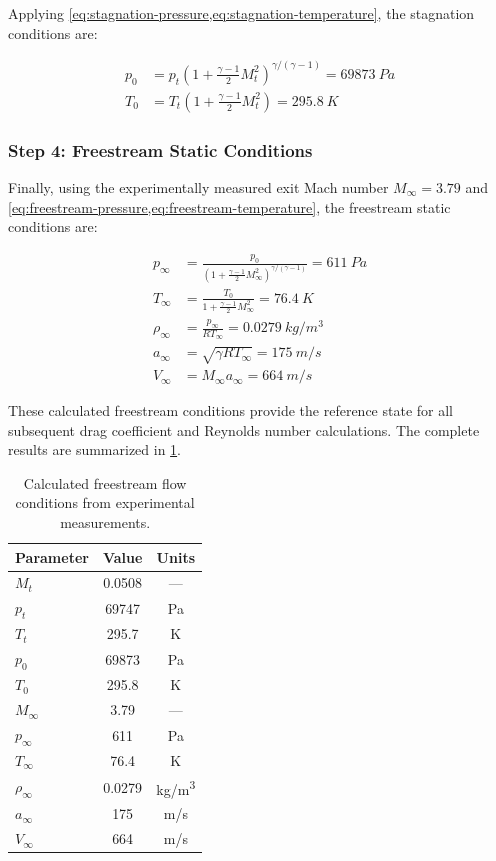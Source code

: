 Applying \cref{eq:stagnation-pressure,eq:stagnation-temperature}, the stagnation conditions are:

\begin{align}
    p_0 &= p_t \left(1 + \frac{\gamma - 1}{2}M_t^2\right)^{\gamma/(\gamma-1)} = \qty{69873}{Pa} \\
    T_0 &= T_t \left(1 + \frac{\gamma - 1}{2}M_t^2\right) = \qty{295.8}{K}
\end{align}

\subsubsection{Step 4: Freestream Static Conditions}

Finally, using the experimentally measured exit Mach number $M_\infty = 3.79$ and \cref{eq:freestream-pressure,eq:freestream-temperature}, the freestream static conditions are:

\begin{align}
    p_\infty &= \frac{p_0}{\left(1 + \frac{\gamma - 1}{2}M_\infty^2\right)^{\gamma/(\gamma-1)}} = \qty{611}{Pa} \\
    T_\infty &= \frac{T_0}{1 + \frac{\gamma - 1}{2}M_\infty^2} = \qty{76.4}{K} \\
    \rho_\infty &= \frac{p_\infty}{RT_\infty} = \qty{0.0279}{kg/m^3} \\
    a_\infty &= \sqrt{\gamma R T_\infty} = \qty{175}{m/s} \\
    V_\infty &= M_\infty a_\infty = \qty{664}{m/s}
\end{align}

These calculated freestream conditions provide the reference state for all subsequent drag coefficient and Reynolds number calculations.  The complete results are summarized in \cref{tab:results/freestream/summary}.

\begin{table}[H]
    \centering
    \caption{Calculated freestream flow conditions from experimental measurements.}
    \label{tab:results/freestream/summary}
    \begin{tabular}{lcc}
        \toprule
        \textbf{Parameter} & \textbf{Value} & \textbf{Units} \\
        \midrule
        $M_t$ & 0.0508 & --- \\
        $p_t$ & 69747 & Pa \\
        $T_t$ & 295.7 & K \\
        $p_0$ & 69873 & Pa \\
        $T_0$ & 295.8 & K \\
        $M_\infty$ & 3.79 & --- \\
        $p_\infty$ & 611 & Pa \\
        $T_\infty$ & 76.4 & K \\
        $\rho_\infty$ & 0.0279 & kg/m\textsuperscript{3} \\
        $a_\infty$ & 175 & m/s \\
        $V_\infty$ & 664 & m/s \\
        \bottomrule
    \end{tabular}
\end{table}

